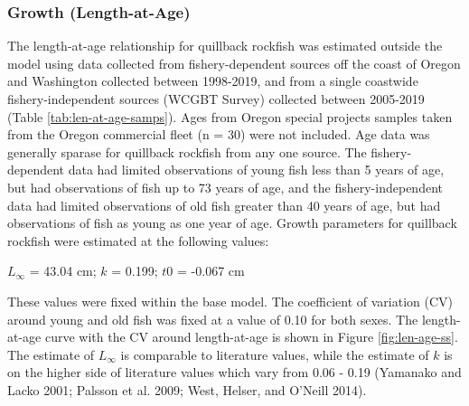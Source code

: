 \documentclass[11pt,
  english,
  a4paper,
]{article}
\begin{document}
\leavevmode\tagmcend\tagstructend\par


\hypertarget{growth-length-at-age}{%
\subsubsection{Growth (Length-at-Age)}\label{growth-length-at-age}}

\leavevmode\tagmcend\tagstructend


The length-at-age relationship for quillback rockfish was estimated outside the model using data collected from fishery-dependent sources off the coast of Oregon and Washington collected between 1998-2019, and from a single coastwide fishery-independent sources (WCGBT Survey) collected between 2005-2019 (Table \ref{tab:len-at-age-samps}). Ages from Oregon special projects samples taken from the Oregon commercial fleet (n = 30) were not included. Age data was generally sparase for quillback rockfish from any one source. The fishery-dependent data had limited observations of young fish less than 5 years of age, but had observations of fish up to 73 years of age, and the fishery-independent data had limited observations of old fish greater than 40 years of age, but had observations of fish as young as one year of age. Growth parameters for quillback rockfish were estimated at the following values:

\leavevmode\tagmcend\tagstructend\par

\begin{centering}

$L_{\infty}$ = 43.04 cm; $k$ = 0.199; $t0$ = -0.067 cm  

\end{centering}


These values were fixed within the base model. The coefficient of variation (CV) around young and old fish was fixed at a value of 0.10 for both sexes. The length-at-age curve with the CV around length-at-age is shown in Figure \ref{fig:len-age-ss}. The estimate of {\(L_{\infty}\)\leavevmode\tagmcend\tagstructend} is comparable to literature values, while the estimate of {\(k\)\leavevmode\tagmcend\tagstructend} is on the higher side of literature values which vary from 0.06 - 0.19 {(Yamanako and Lacko 2001; Palsson et al. 2009; West, Helser, and O'Neill 2014)\leavevmode\tagmcend\tagstructend}.
\end{document}
